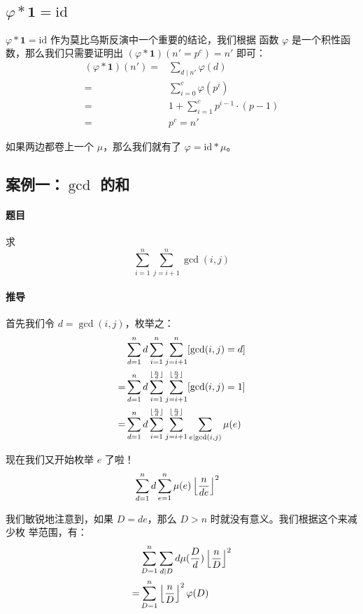 \subsection{$\varphi * \mathbf{1} = \mathrm{id}$}
$\varphi * \mathbf{1} = \mathrm{id}$ 作为莫比乌斯反演中一个重要的结论，我们根据
函数 $\varphi$ 是一个积性函数，那么我们只需要证明出 $(\varphi * \mathbf{1})(n' =
p^c) = n'$ 即可：\begin{align*}
    (\varphi * \mathbf{1})(n') = {} & \sum_{d \mid n'} \varphi(d) \\
                               = {} & \sum_{i = 0}^{c} \varphi(p^i) \\
                               = {} & 1 + \sum_{i = 1}^{c} p^{i - 1} \cdot (p - 1) \\
                               = {} & p^c = n'
\end{align*}

如果两边都卷上一个 $\mu$，那么我们就有了 $\varphi = \mathrm{id} * \mu$。



\subsection{案例一：$\gcd$ 的和}
\paragraph{题目} 求 \[
    \sum_{i=1}^{n} \sum_{j=i+1}^{n} \gcd(i, j)
\]

\paragraph{推导} 首先我们令 $d = \gcd(i, j)$，枚举之：\begin{align*}
     & \sum_{d=1}^{n} d \sum_{i=1}^{n} \sum_{j=i+1}^{n} [\gcd(i, j) = d]\\
    =& \sum_{d=1}^{n} d \sum_{i=1}^{\lfloor{n \over d}\rfloor}
    \sum_{j=i+1}^{\lfloor{n \over d}\rfloor} [\gcd(i, j) = 1] \\
    =& \sum_{d=1}^{n} d \sum_{i=1}^{\lfloor{n \over d}\rfloor}
    \sum_{j=i+1}^{\lfloor{n \over d}\rfloor} \sum_{e \mid \gcd(i, j)} \mu(e)
\end{align*}

现在我们又开始枚举 $e$ 了啦！\begin{align*}
    & \sum_{d=1}^{n} d \sum_{e=1}^{n} \mu(e) \left\lfloor{n \over de}\right\rfloor^2
\end{align*}

我们敏锐地注意到，如果 $D = de$，那么 $D > n$ 时就没有意义。我们根据这个来减少枚
举范围，有：\begin{align*}
    & \sum_{D=1}^{n} \sum_{d \mid D} d \mu({D \over d}) \left\lfloor{n \over D}\right\rfloor^2 \\
    = & \sum_{D=1}^{n} \left\lfloor{n \over D}\right\rfloor^2 \varphi(D) 
\end{align*}
